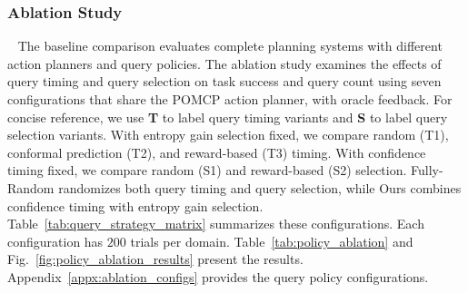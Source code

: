 \subsubsection{Ablation Study}~\label{exp:when_what_random}\label{exp:policy_ablation}
The baseline comparison evaluates complete planning systems with different action planners and query policies. The ablation study examines the effects of query timing and query selection on task success and query count using seven configurations that share the POMCP action planner, with oracle feedback. For concise reference, we use \textbf{T} to label query timing variants and \textbf{S} to label query selection variants. With entropy gain selection fixed, we compare random (T1), conformal prediction (T2), and reward-based (T3) timing. With confidence timing fixed, we compare random (S1) and reward-based (S2) selection. Fully-Random randomizes both query timing and query selection, while Ours combines confidence timing with entropy gain selection. Table~\ref{tab:query_strategy_matrix} summarizes these configurations. Each configuration has $200$ trials per domain. Table~\ref{tab:policy_ablation} and Fig.~\ref{fig:policy_ablation_results} present the results. Appendix~\ref{appx:ablation_configs} provides the query policy configurations.

